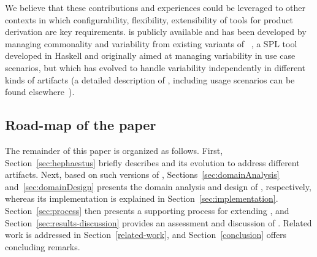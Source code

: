 We believe that these contributions and experiences could be leveraged to other contexts in which configurability, flexibility, extensibility of tools for product derivation are key requirements. \hpl{} is publicly available  and has been developed by managing commonality and variability from existing variants of \hp~\cite{rbonifacio:sbcars2009}, a SPL tool developed in Haskell and originally aimed at managing variability in use case scenarios, but which has evolved to handle variability independently in different kinds of artifacts (a detailed description of \hp, including usage scenarios can be found elsewhere~\cite{rbonifacio:sbcars2009}). 


\bigskip

\subsection*{Road-map of the paper}

The remainder of this paper is organized as follows. First, Section~\ref{sec:hephaestus} briefly describes \hp{} and its evolution to address different artifacts. Next, based on such versions of \hp, Sections~\ref{sec:domainAnalysis} and~\ref{sec:domainDesign} presents the domain analysis and design of \hpl, respectively, whereas its implementation is explained in Section~\ref{sec:implementation}. Section~\ref{sec:process} then presents a supporting process for extending \hpl, and  Section~\ref{sec:results-discussion} provides an assessment and discussion of \hpl. Related work is addressed in Section~\ref{related-work}, and Section~\ref{conclusion} offers concluding remarks.

